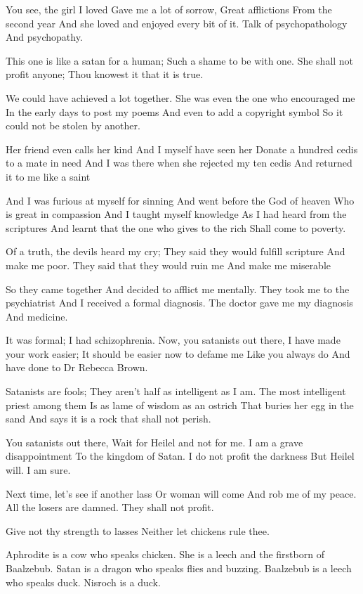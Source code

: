 \documentclass[
]{book}
\begin{document}
You see, the girl I loved
Gave me a lot of sorrow,
Great afflictions
From the second year
And she loved and enjoyed every bit of it.
Talk of psychopathology
And psychopathy.

This one is like a satan for a human;
Such a shame to be with one.
She shall not profit anyone;
Thou knowest it that it is true.

We could have achieved a lot together.
She was even the one who encouraged me
In the early days to post my poems
And even to add a copyright symbol
So it could not be stolen by another.

Her friend even calls her kind
And I myself have seen her
Donate a hundred cedis to a mate in need
And I was there when she rejected my ten cedis
And returned it to me like a saint

And I was furious at myself for sinning
And went before the God of heaven
Who is great in compassion
And I taught myself knowledge
As I had heard from the scriptures
And learnt that the one who gives to the rich
Shall come to poverty.

Of a truth, the devils heard my cry;
They said they would fulfill scripture
And make me poor.
They said that they would ruin me
And make me miserable

So they came together
And decided to afflict me mentally.
They took me to the psychiatrist
And I received a formal diagnosis.
The doctor gave me my diagnosis
And medicine.

It was formal;
I had schizophrenia.
Now, you satanists out there,
I have made your work easier;
It should be easier now to defame me
Like you always do
And have done to Dr Rebecca Brown.

Satanists are fools;
They aren't half as intelligent as I am.
The most intelligent priest among them
Is as lame of wisdom as an ostrich
That buries her egg in the sand
And says it is a rock that shall not perish.

You satanists out there,
Wait for Heilel and not for me.
I am a grave disappointment
To the kingdom of Satan.
I do not profit the darkness
But Heilel will.
I am sure.

Next time, let's see if another lass
Or woman will come
And rob me of my peace.
All the losers are damned.
They shall not profit.

Give not thy strength to lasses
Neither let chickens rule thee.

Aphrodite is a cow who speaks chicken.
She is a leech and the firstborn of Baalzebub.
Satan is a dragon who speaks flies and buzzing.
Baalzebub is a leech who speaks duck.
Nisroch is a duck.
\end{document}
